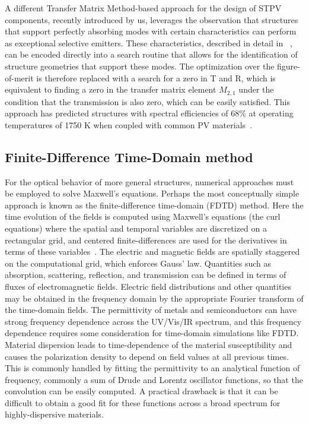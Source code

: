 \documentclass[10pt,letterpaper]{article}
\begin{document}
A different Transfer Matrix Method-based approach for the design of STPV components, recently introduced by us, 
leverages the observation that structures that support perfectly absorbing modes with 
certain characteristics can perform as exceptional selective emitters.  These characteristics, described in detail in
~\cite{FUS_OptExp_2015}, can be
encoded directly into a search routine that allows for the identification of structure geometries that support these modes.  The
optimization over the figure-of-merit is therefore replaced with a search for a zero in T and R, which is equivalent to finding
a zero in the transfer matrix element $M_{2,1}$ under the condition that the transmission is also zero, which can be easily satisfied.
This approach has predicted structures with spectral efficiencies of 68\% at operating temperatures of 1750 K when coupled
with common PV materials~\cite{FUS_OptExp_2015}.

\subsection{Finite-Difference Time-Domain method}

For the optical behavior of more general structures, numerical approaches must be employed to solve Maxwell's equations.  Perhaps the
most conceptually simple approach is known as the finite-difference time-domain (FDTD) method.  Here the time evolution of the fields
is computed using Maxwell's equations (the curl equations) where the spatial and temporal variables are discretized on a rectangular
grid, and centered finite-differences are used for the derivatives in terms of these variables~\cite{Taflove_FDTD}.
The electric and magnetic fields are spatially
staggered on the computational grid, which enforces Gauss' law.  Quantities such as absorption, scattering, reflection, and transmission
can be defined in terms of fluxes of electromagnetic fields.  Electric field distributions and other quantities may be obtained in the
frequency domain by the appropriate Fourier transform of the time-domain fields.  The permittivity of metals and semiconductors can
have strong frequency dependence across the UV/Vis/IR spectrum, and this frequency dependence requires some consideration for time-domain
simulations like FDTD.  
Material dispersion leads to time-dependence of the material susceptibility and 
causes the polarization
density to depend on field values at all previous times.  
This is commonly handled by fitting the permittivity to an analytical
function of frequency, commonly a sum of Drude and Lorentz oscillator functions, so that the convolution can be easily computed.  A
practical drawback is that it can be difficult to obtain a good fit for these functions across a broad spectrum for highly-dispersive materials.
\end{document}
